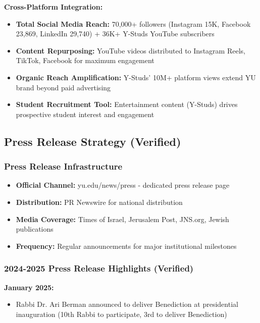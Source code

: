 \documentclass[12pt,letterpaper]{article}
\begin{document}
\textbf{Cross-Platform Integration:}
\begin{itemize}[leftmargin=*]
    \item \textbf{Total Social Media Reach:} 70,000+ followers (Instagram 15K, Facebook 23,869, LinkedIn 29,740) + 36K+ Y-Studs YouTube subscribers
    \item \textbf{Content Repurposing:} YouTube videos distributed to Instagram Reels, TikTok, Facebook for maximum engagement
    \item \textbf{Organic Reach Amplification:} Y-Studs' 10M+ platform views extend YU brand beyond paid advertising
    \item \textbf{Student Recruitment Tool:} Entertainment content (Y-Studs) drives prospective student interest and engagement
\end{itemize}

\subsection{Press Release Strategy (Verified)}

\subsubsection{Press Release Infrastructure}
\begin{itemize}[leftmargin=*]
    \item \textbf{Official Channel:} yu.edu/news/press - dedicated press release page
    \item \textbf{Distribution:} PR Newswire for national distribution
    \item \textbf{Media Coverage:} Times of Israel, Jerusalem Post, JNS.org, Jewish publications
    \item \textbf{Frequency:} Regular announcements for major institutional milestones
\end{itemize}

\subsubsection{2024-2025 Press Release Highlights (Verified)}

\textbf{January 2025:}
\begin{itemize}[leftmargin=*]
    \item Rabbi Dr. Ari Berman announced to deliver Benediction at presidential inauguration (10th Rabbi to participate, 3rd to deliver Benediction)
\end{itemize}
\end{document}
